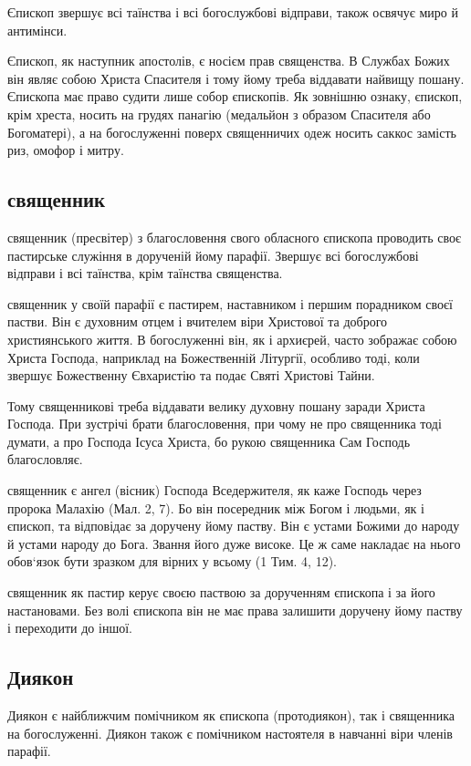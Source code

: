 \documentclass[main.tex]{subfiles}
\begin{document}
Єпископ звершує всі таїнства і всі богослужбові відправи, також освячує миро й антимінси.

Єпископ, як наступник апостолів, є носієм прав священства. В Службах Божих він являє собою Христа Спасителя і тому йому треба віддавати найвищу пошану. Єпископа має право судити лише собор єпископів. Як зовнішню ознаку, єпископ, крім хреста, носить на грудях панагію (медальйон з образом Спасителя або Богоматері), а на богослуженні поверх священничих одеж носить саккос замість риз, омофор і митру.

\subsection{священник}

священник (пресвітер) з благословення свого обласного єпископа проводить своє пастирське служіння в дорученій йому парафії. Звершує всі богослужбові відправи і всі таїнства, крім таїнства священства.

священник у своїй парафії є пастирем, наставником і першим порадником своєї пастви. Він є духовним отцем і вчителем віри Христової та доброго християнського життя. В богослуженні він, як і архиєрей, часто зображає собою Христа Господа, наприклад на Божественній Літургії, особливо тоді, коли звершує Божественну Євхаристію та подає Святі Христові Тайни.

Тому священникові треба віддавати велику духовну пошану заради Христа Господа. При зустрічі брати благословення, при чому не про священника тоді думати, а про Господа Ісуса Христа, бо рукою священника Сам Господь благословляє.

священник є ангел (вісник) Господа Вседержителя, як каже Господь через пророка Малахію (Мал. 2, 7). Бо він посередник між Богом і людьми, як і єпископ, та відповідає за доручену йому паству. Він є устами Божими до народу й устами народу до Бога. Звання його дуже високе. Це ж саме накладає на нього обов`язок бути зразком для вірних у всьому (1 Тим. 4, 12).

священник як пастир керує своєю паствою за дорученням єпископа і за його настановами. Без волі єпископа він не має права залишити доручену йому паству і переходити до іншої.

\subsection{Диякон}

Диякон є найближчим помічником як єпископа (протодиякон), так і священника на богослуженні. Диякон також є помічником настоятеля в навчанні віри членів парафії.
\end{document}
